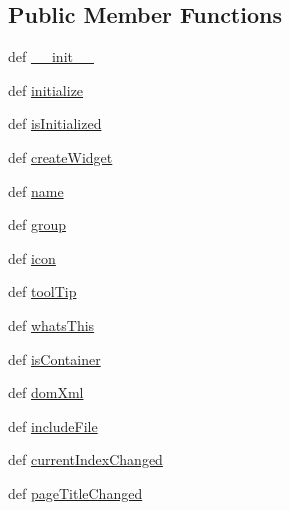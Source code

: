 \subsection*{Public Member Functions}
\begin{DoxyCompactItemize}
\item 
def \hyperlink{classmultipagewidgetplugin_1_1MultiPageWidgetPlugin_a79074010f5ec32b48f66625b862eb37d}{\+\_\+\+\_\+init\+\_\+\+\_\+}
\item 
def \hyperlink{classmultipagewidgetplugin_1_1MultiPageWidgetPlugin_ac2e8bce0c70b52c81a20710771df4f24}{initialize}
\item 
def \hyperlink{classmultipagewidgetplugin_1_1MultiPageWidgetPlugin_a830437adbe7799751c7f74cf496100d9}{is\+Initialized}
\item 
def \hyperlink{classmultipagewidgetplugin_1_1MultiPageWidgetPlugin_a210ace9d5bc5f99e71986d8ef7789dd4}{create\+Widget}
\item 
def \hyperlink{classmultipagewidgetplugin_1_1MultiPageWidgetPlugin_a8aa963bb5d59f83df4722f38d8a08ed7}{name}
\item 
def \hyperlink{classmultipagewidgetplugin_1_1MultiPageWidgetPlugin_a248dc3366438f1637167092c29e7932c}{group}
\item 
def \hyperlink{classmultipagewidgetplugin_1_1MultiPageWidgetPlugin_a72c4528133cec785dff674fa7cdc7379}{icon}
\item 
def \hyperlink{classmultipagewidgetplugin_1_1MultiPageWidgetPlugin_a30019581e7102362e2a01327513681d3}{tool\+Tip}
\item 
def \hyperlink{classmultipagewidgetplugin_1_1MultiPageWidgetPlugin_a08d615073178edc7a3d9deab093f5b04}{whats\+This}
\item 
def \hyperlink{classmultipagewidgetplugin_1_1MultiPageWidgetPlugin_ac00d20beb13423be287e2b4e90bef010}{is\+Container}
\item 
def \hyperlink{classmultipagewidgetplugin_1_1MultiPageWidgetPlugin_ab6d9b67ea2fe7c005602ce54fb5f1fd0}{dom\+Xml}
\item 
def \hyperlink{classmultipagewidgetplugin_1_1MultiPageWidgetPlugin_ae706e8de67445c7bced953ff4cbcf8fc}{include\+File}
\item 
def \hyperlink{classmultipagewidgetplugin_1_1MultiPageWidgetPlugin_a8c041d95b1258361fb63acd75d74f308}{current\+Index\+Changed}
\item 
def \hyperlink{classmultipagewidgetplugin_1_1MultiPageWidgetPlugin_abf82e054c2ce3861c04bed05b5225331}{page\+Title\+Changed}
\end{DoxyCompactItemize}
